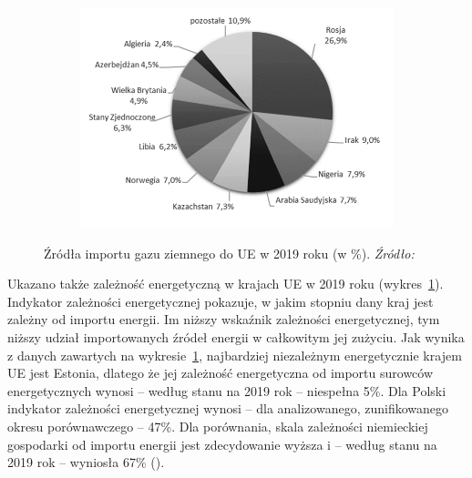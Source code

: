 \documentclass[polish, twoside, 12pt, a4paper]{article}
\theoremstyle{definition}
\theoremstyle{plain}
\theoremstyle{remark}
\begin{document}
\begin{figure}[hbt]
  \centering

  \begin{subfigure}[t]{0.45\textwidth}
    \includegraphics[width=\textwidth]{./figure_3}
  \end{subfigure}

  \captionsetup{margin=10pt,font=small,labelfont=bf,width=.8\textwidth}

  \caption[Źródła importu gazu ziemnego do UE w 2019 roku (w \%).]{Źródła importu gazu ziemnego do UE w 2019 roku (w \%). \textit{Źródło:} \cite{pangsykania2022}}\label{fig:x3}
\end{figure}

Ukazano także zależność energetyczną w krajach UE w 2019 roku (wykres~\ref{fig:x3}). Indykator zależności energetycznej pokazuje, w jakim stopniu dany kraj jest zależny od importu energii. Im niższy wskaźnik zależności energetycznej, tym niższy udział importowanych źródeł energii w całkowitym jej zużyciu. Jak wynika z danych zawartych na wykresie~\ref{fig:x3}, najbardziej niezależnym energetycznie krajem UE jest Estonia, dlatego że jej zależność energetyczna od importu surowców energetycznych wynosi – według stanu na 2019 rok – niespełna 5\%. Dla Polski indykator zależności energetycznej wynosi – dla analizowanego, zunifikowanego okresu porównawczego –  47\%. Dla porównania, skala zależności niemieckiej gospodarki od importu energii jest zdecydowanie wyższa i – według stanu na 2019 rok – wyniosła 67\% (\cite{pangsykania2022}).
\end{document}
